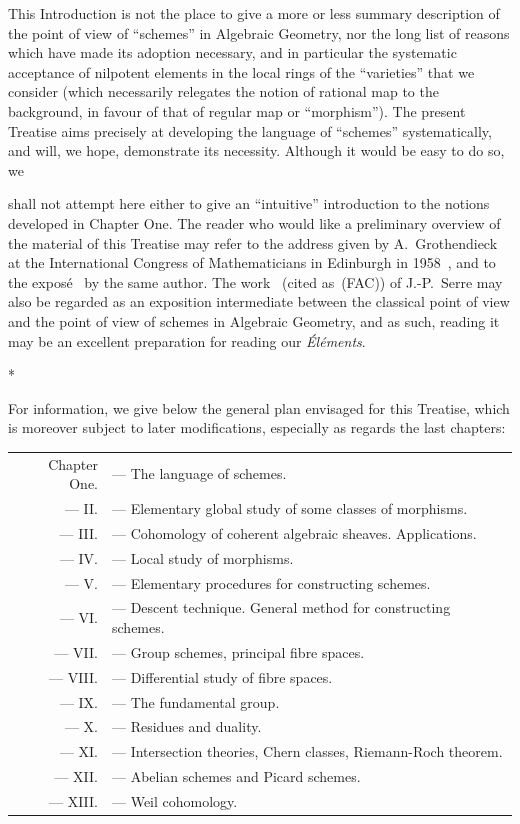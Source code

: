 This Introduction is not the place to give a more or less summary description of the point of view of ``schemes'' in Algebraic Geometry, nor the long list of reasons which have made its adoption necessary, and in particular the systematic acceptance of nilpotent elements in the local rings of the ``varieties'' that we consider (which necessarily relegates the notion of rational map to the background, in favour of that of regular map or ``morphism'').
The present Treatise aims precisely at developing the language of ``schemes'' systematically, and will, we hope, demonstrate its necessity.
Although it would be easy to do so, we

shall not attempt here either to give an ``intuitive'' introduction to the notions developed in Chapter One.
The reader who would like a preliminary overview of the material of this Treatise may refer to the address given by A.~Grothendieck at the International Congress of Mathematicians in Edinburgh in 1958~\cite{I-7}, and to the exposé~\cite{I-8} by the same author.
The work~\cite{I-14} (cited as~(FAC)) of J.-P.~Serre may also be regarded as an exposition intermediate between the classical point of view and the point of view of schemes in Algebraic Geometry, and as such, reading it may be an excellent preparation for reading our \emph{Éléments}.

\bigskip
\begin{center}*\quad*\quad*\end{center}
\bigskip

For information, we give below the general plan envisaged for this Treatise, which is moreover subject to later modifications, especially as regards the last chapters:

\medskip
\begin{tabular}{rl}
  Chapter One. & --- The language of schemes.\\
  --- II. & --- Elementary global study of some classes of morphisms.\\
  --- III. & --- Cohomology of coherent algebraic sheaves. Applications.\\
  --- IV. & --- Local study of morphisms.\\
  --- V. & --- Elementary procedures for constructing schemes.\\
  --- VI. & --- Descent technique. General method for constructing schemes.\\
  --- VII. & --- Group schemes, principal fibre spaces.\\
  --- VIII. & --- Differential study of fibre spaces.\\
  --- IX. & --- The fundamental group.\\
  --- X. & --- Residues and duality.\\
  --- XI. & --- Intersection theories, Chern classes, Riemann-Roch theorem.\\
  --- XII. & --- Abelian schemes and Picard schemes.\\
  --- XIII. & --- Weil cohomology.\\
\end{tabular}
\medskip

